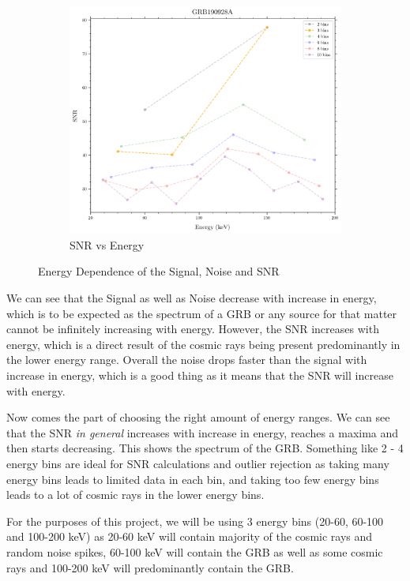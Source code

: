 \documentclass[11pt]{book} %
\begin{document}
\begin{figure}[H]
\begin{subfigure}[b]{0.3\textwidth}
    \end{subfigure}
    \begin{subfigure}[b]{0.3\textwidth}   
        \centering 
        \includegraphics[width=\textwidth]{Pictures/snrvsenergy.png}
        \caption{SNR vs Energy}
    \end{subfigure}
    \caption{Energy Dependence of the Signal, Noise and SNR}
\end{figure}


We can see that the Signal as well as Noise decrease with increase in energy, which is to be expected as the spectrum of a GRB or any source for that matter cannot be infinitely increasing with energy. However, the SNR increases with energy, which is a direct result of the cosmic rays being present predominantly in the lower energy range. Overall the noise drops faster than the signal with increase in energy, which is a good thing as it means that the SNR will increase with energy.

Now comes the part of choosing the right amount of energy ranges. We can see that the SNR \textsl{in general} increases with increase in energy, reaches a maxima and then starts decreasing. This shows the spectrum of the GRB. Something like 2 - 4 energy bins are ideal for SNR calculations and outlier rejection as taking many energy bins leads to limited data in each bin, and taking too few energy bins leads to a lot of cosmic rays in the lower energy bins.

For the purposes of this project, we will be using 3 energy bins (20-60, 60-100 and 100-200 keV) as 20-60 keV will contain majority of the cosmic rays and random noise spikes, 60-100 keV will contain the GRB as well as some cosmic rays and 100-200 keV will predominantly contain the GRB.
\end{document}
